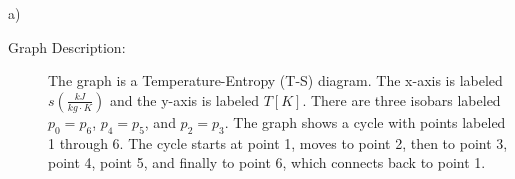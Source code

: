 a)

\begin{description}
    \item[Graph Description:] The graph is a Temperature-Entropy (T-S) diagram. The x-axis is labeled $s \left( \frac{kJ}{kg \cdot K} \right)$ and the y-axis is labeled $T \left[ K \right]$. There are three isobars labeled $p_0 = p_6$, $p_4 = p_5$, and $p_2 = p_3$. The graph shows a cycle with points labeled 1 through 6. The cycle starts at point 1, moves to point 2, then to point 3, point 4, point 5, and finally to point 6, which connects back to point 1.
\end{description}